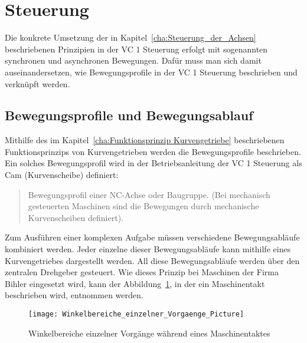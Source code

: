 \section{Steuerung}

Die konkrete Umsetzung der in Kapitel~\ref{cha:Steuerung_der_Achsen} beschriebenen Prinzipien in der VC 1 Steuerung erfolgt mit sogenannten synchronen und asynchronen Bewegungen. Dafür muss man sich damit auseinandersetzen, wie Bewegungsprofile in der VC 1 Steuerung beschrieben und verknüpft werden.





\subsection{Bewegungsprofile und Bewegungsablauf}\label{cha:Bewegungsprofile und Bewegungsablauf}

Mithilfe des im Kapitel~\ref{cha:Funktionsprinzip Kurvengetriebe} beschriebenen Funktionsprinzips von Kurvengetrieben werden die Bewegungsprofile beschrieben. Ein solches Bewegungsprofil wird in der Betriebsanleitung der VC 1 Steuerung als Cam (Kurvenscheibe) definiert:

\blockquote{Bewegungsprofil einer NC-Achse oder Baugruppe. (Bei mechanisch gesteuerten Maschinen sind die Bewegungen durch mechanische Kurvenscheiben definiert).} \cite{OttoBihlerMaschinenfabrikGmbH&Co.KG2015}

Zum Ausführen einer komplexen Aufgabe müssen verschiedene Bewegungsabläufe kombiniert werden. Jeder einzelne dieser Bewegungsabläufe kann mithilfe eines Kurvengetriebes dargestellt werden. All diese Bewegungsabläufe werden über den zentralen Drehgeber gesteuert. Wie dieses Prinzip bei Maschinen der Firma Bihler eingesetzt wird, kann der Abbildung~\ref{fig:Winkelbereiche einzelner Vorgaenge}, in der ein Maschinentakt beschrieben wird, entnommen werden.


\begin{figure}[ht]
\begin{minipage}[c][0.55\textwidth][c]{0.4\textwidth}

\end{minipage}
\hfill
\begin{minipage}[c][0.55\textwidth][c]{0.5\textwidth}
\texttt{[image: Winkelbereiche\_einzelner\_Vorgaenge\_Picture]}
\end{minipage}

\caption{Winkelbereiche einzelner Vorgänge während eines Maschinentaktes}\label{fig:Winkelbereiche einzelner Vorgaenge}
\end{figure}








